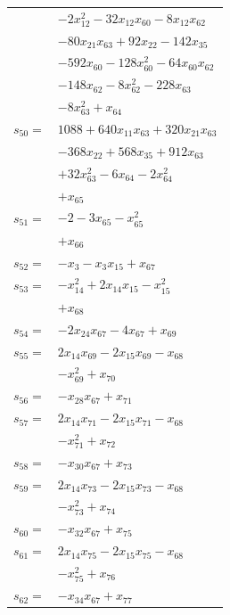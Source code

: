 \begin{longtable}{@{}r@{\;}l@{}}
 & \(\displaystyle -2x_{12}^{2} -32x_{12}x_{60} -8x_{12}x_{62}\) \\
 & \(\displaystyle -80x_{21}x_{63} +92x_{22} -142x_{35}\) \\
 & \(\displaystyle -592x_{60} -128x_{60}^{2} -64x_{60}x_{62}\) \\
 & \(\displaystyle -148x_{62} -8x_{62}^{2} -228x_{63}\) \\
 & \(\displaystyle -8x_{63}^{2} +x_{64}\) \\[3pt]
\(s_{50}=\) & \(\displaystyle 1088 +640x_{11}x_{63} +320x_{21}x_{63}\) \\
 & \(\displaystyle -368x_{22} +568x_{35} +912x_{63}\) \\
 & \(\displaystyle +32x_{63}^{2} -6x_{64} -2x_{64}^{2}\) \\
 & \(\displaystyle +x_{65}\) \\[3pt]
\(s_{51}=\) & \(\displaystyle -2 -3x_{65} -x_{65}^{2}\) \\
 & \(\displaystyle +x_{66}\) \\[3pt]
\(s_{52}=\) & \(\displaystyle -x_{3} -x_{3}x_{15} +x_{67}\) \\[3pt]
\(s_{53}=\) & \(\displaystyle -x_{14}^{2} +2x_{14}x_{15} -x_{15}^{2}\) \\
 & \(\displaystyle +x_{68}\) \\[3pt]
\(s_{54}=\) & \(\displaystyle -2x_{24}x_{67} -4x_{67} +x_{69}\) \\[3pt]
\(s_{55}=\) & \(\displaystyle 2x_{14}x_{69} -2x_{15}x_{69} -x_{68}\) \\
 & \(\displaystyle -x_{69}^{2} +x_{70}\) \\[3pt]
\(s_{56}=\) & \(\displaystyle -x_{28}x_{67} +x_{71}\) \\[3pt]
\(s_{57}=\) & \(\displaystyle 2x_{14}x_{71} -2x_{15}x_{71} -x_{68}\) \\
 & \(\displaystyle -x_{71}^{2} +x_{72}\) \\[3pt]
\(s_{58}=\) & \(\displaystyle -x_{30}x_{67} +x_{73}\) \\[3pt]
\(s_{59}=\) & \(\displaystyle 2x_{14}x_{73} -2x_{15}x_{73} -x_{68}\) \\
 & \(\displaystyle -x_{73}^{2} +x_{74}\) \\[3pt]
\(s_{60}=\) & \(\displaystyle -x_{32}x_{67} +x_{75}\) \\[3pt]
\(s_{61}=\) & \(\displaystyle 2x_{14}x_{75} -2x_{15}x_{75} -x_{68}\) \\
 & \(\displaystyle -x_{75}^{2} +x_{76}\) \\[3pt]
\(s_{62}=\) & \(\displaystyle -x_{34}x_{67} +x_{77}\) \\[3pt]

\end{longtable}
